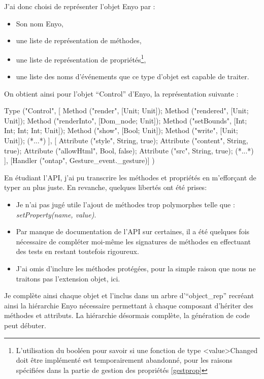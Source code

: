 \documentclass[11pt,a4paper]{report}
\begin{document}
J'ai donc choisi de représenter l'objet Enyo par :
\begin{itemize}
\item Son nom Enyo,
\item une liste de représentation de méthodes,
\item une liste de représentation de propriétés\footnote{L'utilisation du booléen pour savoir si 
une fonction de type <value>Changed doit être implémenté est temporairement abandonné, pour
les raisons spécifiées dans la partie de gestion des propriétés \ref{gestprop}},
\item une liste des noms d'événements que ce type d'objet est capable de traiter.
\end{itemize}

On obtient ainsi pour l'objet ``Control'' d'Enyo, la représentation suivante :

\begin{OCaml}
Type ("Control",
      [
	Method ("render", [Unit; Unit]);
	Method ("rendered", [Unit; Unit]);
	Method ("renderInto", [Dom_node; Unit]);
	Method ("setBounds", [Int; Int; Int; Int; Unit]);
	Method ("show", [Bool; Unit]);
	Method ("write", [Unit; Unit]);
        (*...*)
      ],
      [
	Attribute ("style", String, true);
	Attribute ("content", String, true);
	Attribute ("allowHtml", Bool, false);
	Attribute ("src", String, true);
        (*...*)
      ],
      [Handler ("ontap", Gesture_event._gesture)]
)
\end{OCaml}

En étudiant l'API, j'ai pu transcrire les méthodes et propriétés en m'efforçant de typer au plus juste.
En revanche, quelques libertés ont été prises:
\begin{itemize}
\item Je n'ai pas jugé utile l'ajout de méthodes trop polymorphes telle que : \emph{setProperty(name, value)}.
\item Par manque de documentation de l'API sur certaines, il a été quelques fois nécessaire de compléter 
  moi-même les signatures de méthodes en effectuant des tests en restant toutefois rigoureux.  
\item J'ai omis d'inclure les méthodes protégées, pour la simple raison que nous ne traitons pas
  l'extension objet, ici.
\end{itemize}\medskip

Je complète ainsi chaque objet et l'inclus dans un arbre d'``object\_rep'' recréant ainsi la hiérarchie
Enyo nécessaire permettant à chaque composant d'hériter des méthodes et attributs.
La hiérarchie désormais complète, la génération de code peut débuter.
\end{document}
